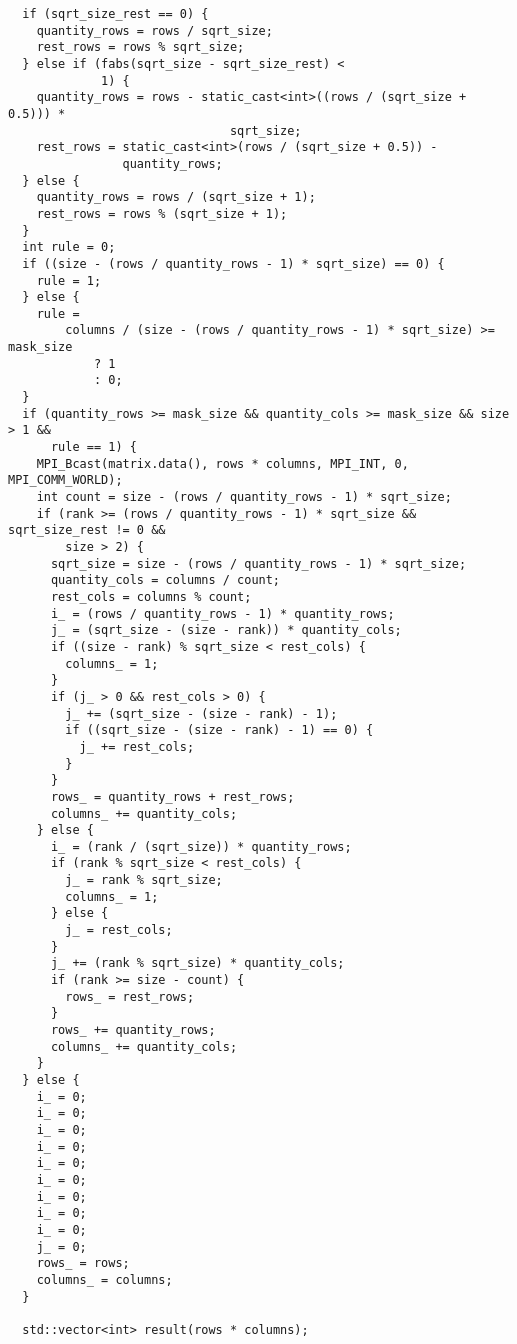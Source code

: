 \documentclass{report}
\begin{document}
\begin{lstlisting}
  if (sqrt_size_rest == 0) {  
    quantity_rows = rows / sqrt_size; 
    rest_rows = rows % sqrt_size;  
  } else if (fabs(sqrt_size - sqrt_size_rest) <
             1) {  
    quantity_rows = rows - static_cast<int>((rows / (sqrt_size + 0.5))) *
                               sqrt_size;  
    rest_rows = static_cast<int>(rows / (sqrt_size + 0.5)) -
                quantity_rows;  
  } else {
    quantity_rows = rows / (sqrt_size + 1); 
    rest_rows = rows % (sqrt_size + 1); 
  }
  int rule = 0;
  if ((size - (rows / quantity_rows - 1) * sqrt_size) == 0) {
    rule = 1;
  } else {
    rule =
        columns / (size - (rows / quantity_rows - 1) * sqrt_size) >= mask_size
            ? 1
            : 0;
  }
  if (quantity_rows >= mask_size && quantity_cols >= mask_size && size > 1 &&
      rule == 1) {
    MPI_Bcast(matrix.data(), rows * columns, MPI_INT, 0, MPI_COMM_WORLD);
    int count = size - (rows / quantity_rows - 1) * sqrt_size;
    if (rank >= (rows / quantity_rows - 1) * sqrt_size && sqrt_size_rest != 0 &&
        size > 2) {
      sqrt_size = size - (rows / quantity_rows - 1) * sqrt_size;
      quantity_cols = columns / count;
      rest_cols = columns % count;
      i_ = (rows / quantity_rows - 1) * quantity_rows;
      j_ = (sqrt_size - (size - rank)) * quantity_cols;
      if ((size - rank) % sqrt_size < rest_cols) {
        columns_ = 1;
      }
      if (j_ > 0 && rest_cols > 0) {
        j_ += (sqrt_size - (size - rank) - 1);
        if ((sqrt_size - (size - rank) - 1) == 0) {
          j_ += rest_cols;
        }
      }
      rows_ = quantity_rows + rest_rows;
      columns_ += quantity_cols;
    } else {
      i_ = (rank / (sqrt_size)) * quantity_rows;
      if (rank % sqrt_size < rest_cols) {
        j_ = rank % sqrt_size;
        columns_ = 1;
      } else {
        j_ = rest_cols;
      }
      j_ += (rank % sqrt_size) * quantity_cols;
      if (rank >= size - count) {
        rows_ = rest_rows;
      }
      rows_ += quantity_rows;
      columns_ += quantity_cols;
    }
  } else {
    i_ = 0;
    i_ = 0;
    i_ = 0;
    i_ = 0;
    i_ = 0;
    i_ = 0;
    i_ = 0;
    i_ = 0;
    i_ = 0;
    j_ = 0;
    rows_ = rows;
    columns_ = columns;
  }

  std::vector<int> result(rows * columns);


\end{lstlisting}
\end{document}

